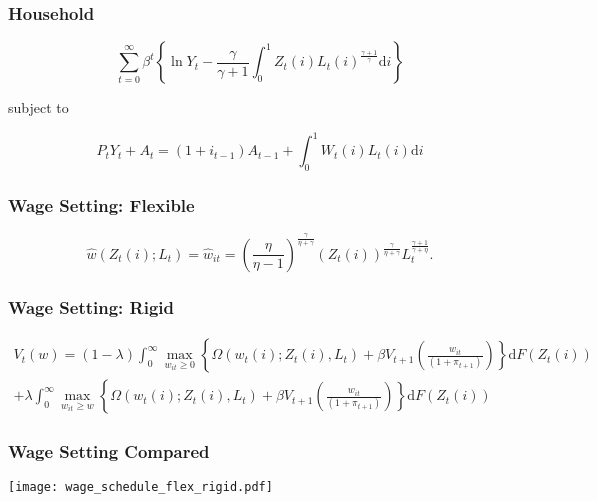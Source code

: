 \documentclass{beamer}
\begin{document}
\begin{frame}[t]\frametitle{Household}

    \begin{equation*} \label{eq:utility}
        \sum_{t=0}^{\infty} \beta^t \left\{\ln Y_t - \frac{\gamma}{\gamma + 1} \int_{0}^{1} Z_t(i)L_t(i)^{\frac{\gamma + 1}{\gamma}}\mathrm{d}i\right\}
    \end{equation*}

    subject to

    \begin{equation*}
        \label{eq:budget}
        P_t Y_t + A_t = \left(1 + i_{t-1}\right)A_{t-1} + \int_{0}^{1}\! W_t(i)L_t(i)\mathrm{d}i
    \end{equation*}

\end{frame}


\begin{frame}[t]\frametitle{Wage Setting: Flexible}

    \begin{equation*}
        \label{eq:flex}
        \hat{w}(Z_t(i); L_t) = \hat{w}_{it} = \left( \frac{\eta}{\eta - 1} \right)^{\frac{\gamma}{\eta + \gamma}}\left( Z_t(i) \right)^{\frac{\gamma}{\eta + \gamma}} L_t^{\frac{\gamma + 1}{\gamma + \eta}}.
    \end{equation*}


\end{frame}



\begin{frame}[t]\frametitle{Wage Setting: Rigid}

    \begin{multline}
        \label{eq:value_function}
        V_t(w) = (1 - \lambda) \int_{0}^{\infty} \max_{w_{it} \geq 0} \left\{ \Omega( w_t(i); Z_t(i), L_t ) + \beta V_{t+1}\left( \frac{w_{it}}{(1 + \pi_{t+1})} \right) \right\} \mathrm{d}F(Z_t(i)) \\
                    + \lambda  \int_{0}^{\infty} \max_{w_{it} \geq w} \left\{ \Omega( w_t(i); Z_t(i), L_t ) + \beta V_{t+1}\left( \frac{w_{it}}{(1 + \pi_{t+1})} \right) \right\} \mathrm{d}F(Z_t(i))
    \end{multline}


\end{frame}

\begin{frame}[t]\frametitle{Wage Setting Compared}

    \begin{center}
      \noindent \texttt{[image: wage\_schedule\_flex\_rigid.pdf]}
      \label{fig:wage_schedules}
    \end{center}

\end{frame}
\end{document}
